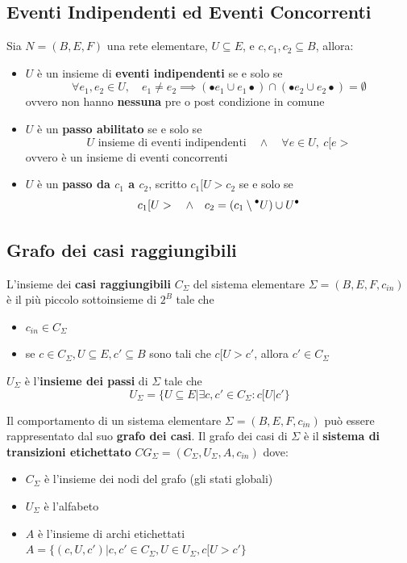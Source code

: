 \subsection{Eventi Indipendenti ed Eventi Concorrenti}
Sia $N = (B, E, F)$ una rete elementare, $U \subseteq E$, e $c, c_1, c_2 \subseteq B$, allora:
\begin{itemize}
	\item $U$ è un insieme di \textbf{eventi indipendenti} se e solo se
	      \[
		      \forall e_1, e_2 \in U, \quad e_1 \neq e_2
		      \implies
		      (\bullet e_1 \cup e_1 \bullet) \cap (\bullet e_2 \cup e_2 \bullet)
		      =
		      \emptyset
	      \]
	      ovvero non hanno \textbf{nessuna} pre o post condizione in comune
	\item $U$ è un \textbf{passo abilitato} se e solo se
	      \[
		      U \text{ insieme di eventi indipendenti} \quad \wedge \quad \forall e \in U, \ c[e >
	      \]
	      ovvero è un insieme di eventi concorrenti
	\item $U$ è un \textbf{passo da $c_1$ a $c_2$}, scritto $c_1[U > c_2$ se e solo se
	      \[
		      c_1[U >
		      \quad \wedge \quad
		      c_2 = (c_1 \setminus \prescript{\bullet}{}{U}) \cup U^\bullet
	      \]
\end{itemize}

\subsection{Grafo dei casi raggiungibili}

L'insieme dei \textbf{casi raggiungibili} $C_\Sigma$ del sistema elementare $\Sigma = (B, E, F, c_{in})$ è il più piccolo sottoinsieme di $2^B$ tale che
\begin{itemize}
	\renewcommand\labelitemi{} %
	\item $c_{in}  \in C_\Sigma$
	\item se $c \in C_\Sigma, U \subseteq E, c' \subseteq B$ sono tali che $c[U > c'$, allora $c' \in C_\Sigma$
\end{itemize}
\vspace{1em}
$U_\Sigma$ è l'\textbf{insieme dei passi} di $\Sigma$ tale che
\[
	U_\Sigma = \{ U \subseteq E | \exists c, c' \in C_\Sigma : c[U | c' \}
\]

\noindent
Il comportamento di un sistema elementare $\Sigma = (B, E, F, c_{in})$ può essere rappresentato dal suo \textbf{grafo dei casi}. Il grafo dei casi di $\Sigma$ è il \textbf{sistema di transizioni etichettato} $CG_\Sigma = (C_\Sigma, U_\Sigma, A, c_{in})$ dove:
\begin{itemize}
	\item $C_\Sigma$ è l'insieme dei nodi del grafo (gli stati globali)
	\item $U_\Sigma$ è l'alfabeto
	\item $A$ è l'insieme di archi etichettati\\
	      $A = \{ (c, U, c') | c, c' \in C_\Sigma, U \in U_\Sigma, c[U > c' \}$
\end{itemize}

